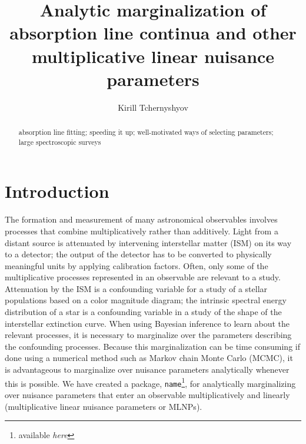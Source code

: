 \documentclass[manuscript]{aastex62}
\begin{document}
\title{Analytic marginalization of absorption line continua and other multiplicative linear nuisance parameters}

\author[0000-0003-0789-9939]{Kirill Tchernyshyov}


\begin{abstract}
absorption line fitting; speeding it up; well-motivated ways of selecting parameters; large spectroscopic surveys
\end{abstract}


\section{Introduction}
\label{sec:introduction}
The formation and measurement of many astronomical observables involves processes that combine multiplicatively rather than additively.
Light from a distant source is attenuated by intervening interstellar matter (ISM) on its way to a detector; the output of the detector has to be converted to physically meaningful units by applying calibration factors.
Often, only some of the multiplicative processes represented in an observable are relevant to a study.
Attenuation by the ISM is a confounding variable for a study of a stellar populations based on a color magnitude diagram; the intrinsic spectral energy distribution of a star is a confounding variable in a study of the shape of the interstellar extinction curve.
When using Bayesian inference to learn about the relevant processes, it is necessary to marginalize over the parameters describing the confounding processes.
Because this marginalization can be time consuming if done using a numerical method such as Markov chain Monte Carlo (MCMC), it is advantageous to marginalize over nuisance parameters analytically whenever this is possible.
We have created a package, \texttt{name}\footnote{available \emph{here}}, for analytically marginalizing over nuisance parameters that enter an observable multiplicatively and linearly (multiplicative linear nuisance parameters or MLNPs).
\end{document}
